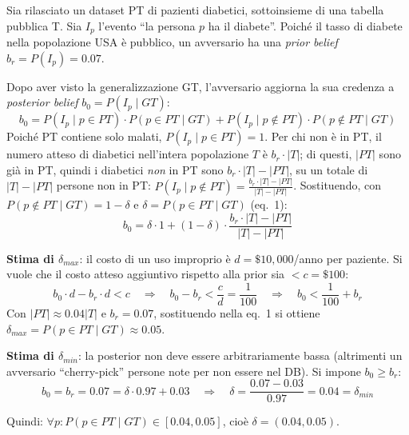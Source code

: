 \documentclass[a4paper,11pt]{article}
\begin{document}
\begin{esempio}
Sia rilasciato un dataset PT di pazienti diabetici, sottoinsieme di una tabella pubblica T. Sia $I_p$ l'evento ``la persona $p$ ha il diabete''. Poich\'{e} il tasso di diabete nella popolazione USA \`{e} pubblico, un avversario ha una \emph{prior belief} $b_r = P(I_p) = 0.07$.

Dopo aver visto la generalizzazione GT, l'avversario aggiorna la sua credenza a \emph{posterior belief} $b_0 = P(I_p \mid GT)$:
\[
b_0 = P(I_p \mid p \in PT) \cdot P(p \in PT \mid GT) + P(I_p \mid p \notin PT) \cdot P(p \notin PT \mid GT)
\]
Poich\'{e} PT contiene solo malati, $P(I_p \mid p \in PT) = 1$. Per chi non \`{e} in PT, il numero atteso di diabetici nell'intera popolazione $T$ \`{e} $b_r \cdot |T|$; di questi, $|PT|$ sono gi\`{a} in PT, quindi i diabetici \emph{non} in PT sono $b_r \cdot |T| - |PT|$, su un totale di $|T| - |PT|$ persone non in PT: $P(I_p \mid p \notin PT) = \frac{b_r \cdot |T| - |PT|}{|T| - |PT|}$. Sostituendo, con $P(p \notin PT \mid GT) = 1-\delta$ e $\delta = P(p \in PT \mid GT)$ (eq.~1):
\[
b_0 = \delta \cdot 1 + (1-\delta) \cdot \frac{b_r \cdot |T| - |PT|}{|T| - |PT|}
\]

\textbf{Stima di $\delta_{max}$}: il costo di un uso improprio \`{e} $d = \$10{,}000$/anno per paziente. Si vuole che il costo atteso aggiuntivo rispetto alla prior sia $< c = \$100$:
\[
b_0 \cdot d - b_r \cdot d < c \quad \Rightarrow \quad b_0 - b_r < \frac{c}{d} = \frac{1}{100} \quad \Rightarrow \quad b_0 < \frac{1}{100} + b_r
\]
Con $|PT| \approx 0.04|T|$ e $b_r = 0.07$, sostituendo nella eq.~1 si ottiene $\delta_{max} = P(p \in PT \mid GT) \approx 0.05$.

\textbf{Stima di $\delta_{min}$}: la posterior non deve essere arbitrariamente bassa (altrimenti un avversario ``cherry-pick'' persone note per non essere nel DB). Si impone $b_0 \geq b_r$:
\[
b_0 = b_r = 0.07 = \delta \cdot 0.97 + 0.03 \quad \Rightarrow \quad \delta = \frac{0.07 - 0.03}{0.97} = 0.04 = \delta_{min}
\]

Quindi: $\forall p : P(p \in PT \mid GT) \in [0.04, 0.05]$, cio\`{e} $\delta = (0.04, 0.05)$.
\end{esempio}
\end{document}
